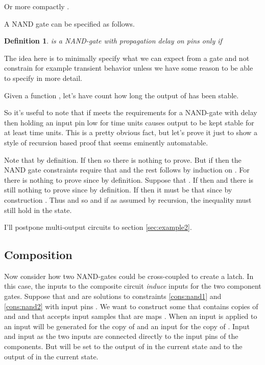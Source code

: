 \documentclass[runningheads,letter]{llncs}
\newtheorem{dfn}{Definition}[section]
\begin{document}
Or more compactly .

A NAND gate can be specified as follows.
\begin{dfn}  is a NAND-gate with propagation delay  on pins  only if

\end{dfn}

The idea here is to minimally specify what we can expect from a gate and not constrain 
for example transient behavior unless we have some reason to be able to specify in more detail.

Given a function , let's have  count how long the output of  has been stable.


So it's useful to note that if  meets the requirements for a NAND-gate with delay 
then holding an input pin low for  time units causes output to be kept stable for at least
 time units. This is a pretty obvious fact, but let's prove it just to show a style of recursion based
proof that seems eminently automatable.

Note that  by definition. If  then  so there is
nothing to prove. But if  then 
the NAND gate constraints require that  and the rest follows by induction on .
For  there is nothing to prove since  by definition.
Suppose that . If  then  and there is still
nothing to prove since  by definition.
If  then it must be that  since by construction . Thus
 and  so  and if  as assumed by recursion, the inequality must still
hold in the  state.

I'll postpone multi-output circuits to section \ref{sec:example2}.
\subsection{Composition}



Now consider how two NAND-gates could be cross-coupled to create a latch. In 
this case, the inputs to the composite circuit \emph{induce} inputs for the
two component gates. Suppose that  and  are solutions to constraints
\ref{cons:nand1} and \ref{cons:nand2} with input pins .
We want to construct some  that
contains copies of  and  and that accepts input samples that are maps
. When an input  is applied to  an input  will
be generated for the copy of  and an input  for the copy of . Input 
and input  as the two inputs are connected directly to the input pins of the components.
But  will be set to the output of  in the current state and  to the output of 
in the current state.
\begin{center}
\fbox{\begin{minipage}{5in}

\end{minipage}
}
\end{center}
\end{document}
